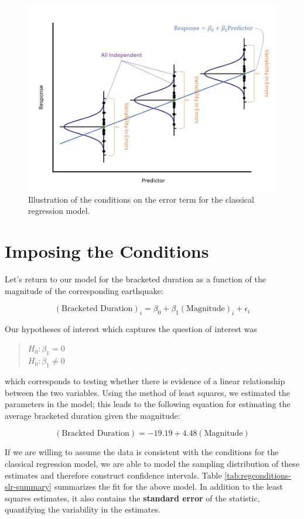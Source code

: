 \documentclass[]{book}
\theoremstyle{plain}
\theoremstyle{mydefn}
\theoremstyle{myexmpl}
\theoremstyle{remark}
\begin{document}
\begin{figure}

{\centering \includegraphics[width=0.8\linewidth]{./images/RegConditions-Assumptions} 

}

\caption{Illustration of the conditions on the error term for the classical regression model.}\label{fig:regconditions-assumptions}
\end{figure}

\section{Imposing the Conditions}\label{imposing-the-conditions}

Let's return to our model for the bracketed duration as a function of
the magnitude of the corresponding earthquake:

\[(\text{Bracketed Duration})_i = \beta_0 + \beta_1(\text{Magnitude})_i + \epsilon_i\]

Our hypotheses of interest which captures the question of interest was

\begin{quote}
\(H_0: \beta_1 = 0\)\\
\(H_0: \beta_1 \neq 0\)
\end{quote}

which corresponds to testing whether there is evidence of a linear
relationship between the two variables. Using the method of least
squares, we estimated the parameters in the model; this leads to the
following equation for estimating the average bracketed duration given
the magnitude:

\[(\text{Brackted Duration}) = -19.19 + 4.48(\text{Magnitude})\]

If we are willing to assume the data is consistent with the conditions
for the classical regression model, we are able to model the sampling
distribution of these estimates and therefore construct confidence
intervals. Table \ref{tab:regconditions-slr-summary} summarizes the fit
for the above model. In addition to the least squares estimates, it also
contains the \textbf{standard error} of the statistic, quantifying the
variability in the estimates.
\end{document}

